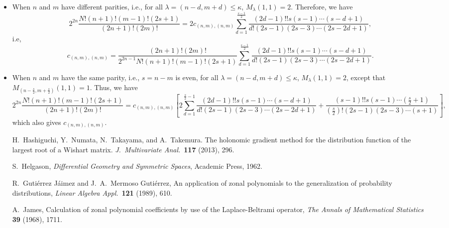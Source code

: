 \documentclass[10pt,oneside,american]{amsart}
\numberwithin{equation}{section}
\numberwithin{figure}{section}
\theoremstyle{definition}
\theoremstyle{remark}
\theoremstyle{plain}
\theoremstyle{definition}
\theoremstyle{plain}
\theoremstyle{plain}
\theoremstyle{plain}
\begin{document}
\begin{itemize}
\item When $n$ and $m$ have different parities, i.e., for all $\lambda=\left(n-d,m+d\right)\leq\kappa$,
$M_{\lambda}\left(1,1\right)=2$. Therefore, we have 
\[
2^{2n}\frac{N!\left(n+1\right)!\left(m-1\right)!\left(2s+1\right)}{\left(2n+1\right)!\left(2m\right)!}=2c_{\left(n,m\right),\left(n,m\right)}\sum_{d=1}^{\frac{s-1}{2}}\frac{\left(2d-1\right)!!s\left(s-1\right)\cdots\left(s-d+1\right)}{d!\left(2s-1\right)\left(2s-3\right)\cdots\left(2s-2d+1\right)},
\]
i.e, 
\[
c_{\left(n,m\right),\left(n,m\right)}=\frac{\left(2n+1\right)!\left(2m\right)!}{2^{2n-1}N!\left(n+1\right)!\left(m-1\right)!\left(2s+1\right)}\sum_{d=1}^{\frac{s-1}{2}}\frac{\left(2d-1\right)!!s\left(s-1\right)\cdots\left(s-d+1\right)}{d!\left(2s-1\right)\left(2s-3\right)\cdots\left(2s-2d+1\right)}.
\]
\item When $n$ and $m$ have the same parity, i.e., $s=n-m$ is even, for
all $\lambda=\left(n-d,m+d\right)\leq\kappa$, $M_{\lambda}\left(1,1\right)=2$,
except that $M_{\left(n-\frac{s}{2},m+\frac{s}{2}\right)}\left(1,1\right)=1$.
Thus, we have 
\[
2^{2n}\frac{N!\left(n+1\right)!\left(m-1\right)!\left(2s+1\right)}{\left(2n+1\right)!\left(2m\right)!}=c_{\left(n,m\right),\left(n,m\right)}\left[2\sum_{d=1}^{\frac{s}{2}-1}\frac{\left(2d-1\right)!!s\left(s-1\right)\cdots\left(s-d+1\right)}{d!\left(2s-1\right)\left(2s-3\right)\cdots\left(2s-2d+1\right)}+\frac{\left(s-1\right)!!s\left(s-1\right)\cdots\left(\frac{s}{2}+1\right)}{\left(\frac{s}{2}\right)!\left(2s-1\right)\left(2s-3\right)\cdots\left(s+1\right)}\right],
\]
which also gives $c_{(n,m),(n,m)}$. 


\begin{thebibliography}{1}
H.~Hashiguchi, Y.~Numata, N.~Takayama, and A.~Takemura.
The holonomic gradient method for the distribution function of the
largest root of a Wishart matrix. \emph{J.~Multivariate Anal.}~\textbf{117}
(2013), 296.

S.~Helgason, \emph{Differential Geometry and Symmetric
Spaces}, Academic Press, 1962.

R.~Guti\'{e}rrez J\'{a}imez and J.~A.~Mermoso
Guti\'{e}rrez, An application of zonal polynomials to the generalization
of probability distributions, \emph{Linear Algebra Appl.}~\textbf{121}
(1989), 610.

A.~James, Calculation of zonal polynomial coefficients
by use of the Laplace-Beltrami operator, \emph{The Annals of Mathematical
Statistics} \textbf{39} (1968), 1711.


\end{thebibliography}
\end{itemize}
\end{document}
